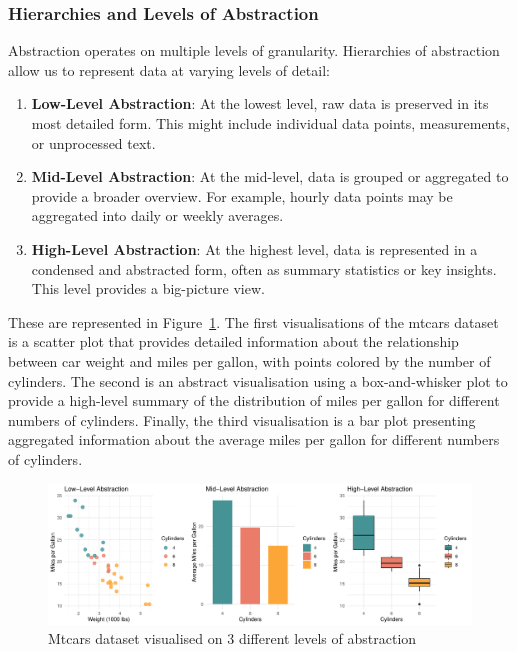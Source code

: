 \documentclass{article}\usepackage[]{graphicx}\usepackage[]{xcolor}
\makeatletter
\def\maxwidth{ %
  \ifdim\Gin@nat@width>\linewidth
    \linewidth
  \else
    \Gin@nat@width
  \fi
}
\newenvironment{knitrout}{}{} %
\makeatother
\begin{document}
\subsubsection{Hierarchies and Levels of Abstraction}
Abstraction operates on multiple levels of granularity. Hierarchies of abstraction allow us to represent data at varying levels of detail: 
\begin{enumerate}
    \item \textbf{Low-Level Abstraction}: At the lowest level, raw data is preserved in its most detailed form. This might include individual data points, measurements, or unprocessed text.
    \item \textbf{Mid-Level Abstraction}: At the mid-level, data is grouped or aggregated to provide a broader overview. For example, hourly data points may be aggregated into daily or weekly averages.
    \item \textbf{High-Level Abstraction}: At the highest level, data is represented in a condensed and abstracted form, often as summary statistics or key insights. This level provides a big-picture view.
\end{enumerate}

These are represented in Figure~\ref{fig:abs-plots}. The first visualisations of the mtcars dataset is a scatter plot that provides detailed information about the relationship between car weight and miles per gallon, with points colored by the number of cylinders. The second is an abstract visualisation using a box-and-whisker plot to provide a high-level summary of the distribution of miles per gallon for different numbers of cylinders. Finally, the third visualisation is a bar plot presenting aggregated information about the average miles per gallon for different numbers of cylinders.

\begin{knitrout}\scriptsize
{}\color{fgcolor}\begin{figure}[H]

{\centering \includegraphics[width=\maxwidth]{figure/beamer-abs-plots-1} 

}

\caption[Mtcars dataset visualised on 3 different levels of abstraction]{Mtcars dataset visualised on 3 different levels of abstraction}\label{fig:abs-plots}
\end{figure}

\end{knitrout}
\end{document}
